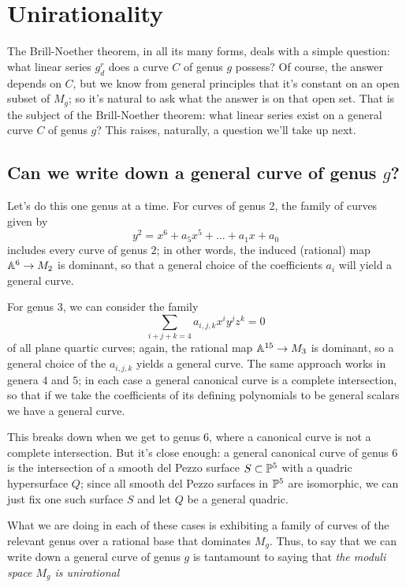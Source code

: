 \section{Unirationality}

The Brill-Noether theorem, in all its many forms, deals with a simple question: what linear series $g^r_d$ does a curve $C$ of genus $g$ possess? Of course, the answer depends on $C$, but we know from general principles that it's constant on an open subset of $M_g$; so it's natural to ask what the answer is on that open set. That is the subject of the Brill-Noether theorem: what linear series exist on a general curve $C$ of genus $g$? This raises, naturally, a question we'll take up next.

\subsection{Can we write down a general curve of genus $g$?}

Let's do this one genus at a time. For curves of genus 2, the family of curves given by
$$
y^2 = x^6 + a_5x^5 + \dots + a_1x + a_0
$$
includes every curve of genus $2$; in other words, the induced (rational) map $\AA^6 \to M_2$ is dominant, so that  a general choice of the coefficients $a_i$ will yield a general curve.

For genus 3, we can consider the family
$$
\sum_{i+j+k = 4} a_{i,j,k}x^i y^jz^k = 0
$$
of all plane quartic curves; again, the rational map $\AA^{15} \to M_3$ is dominant, so a general choice of the $a_{i,j,k}$ yields a general curve. The same approach works in genera $4$ and $5$; in each case a general canonical curve is a complete intersection, so that if we take the coefficients of its defining polynomials to be general scalars we have a general curve.

This breaks down when we get to genus 6, where a canonical curve is not a complete intersection. But it's close enough: a general canonical curve of genus 6 is the intersection of a smooth del Pezzo surface $S \subset \PP^5$ with a quadric hypersurface $Q$; since all smooth del Pezzo surfaces in $\PP^5$ are isomorphic, we can just fix one such surface $S$ and let $Q$ be a general quadric.

What we are doing in each of these cases is exhibiting a family of curves of the relevant genus over a rational base that dominates $M_g$. Thus, to say that we can write down a general curve of genus $g$ is tantamount to saying that \emph{the moduli space $M_g$ is unirational}

